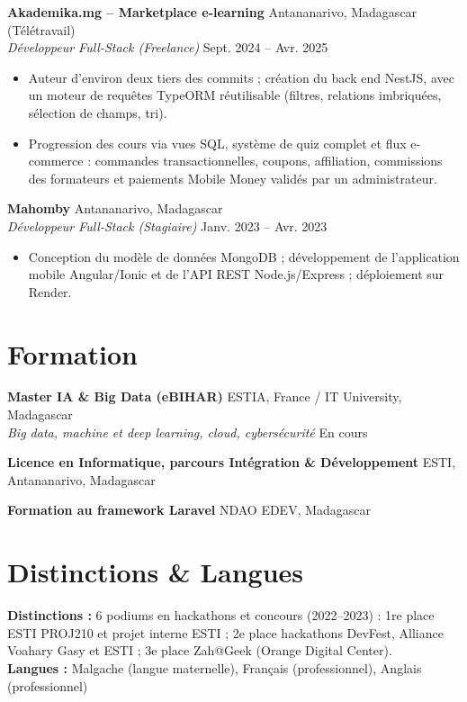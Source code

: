 \documentclass[10pt,a4paper]{article}
\newcommand{\role}[4]{%
  \vspace{3pt}%
  \textbf{#1} \hfill #2\\[-0.1em]
  \textit{#3} \hfill #4\par\vspace{1pt}}
\begin{document}
\role{Akademika.mg -- Marketplace e-learning}{Antananarivo, Madagascar (Télétravail)}{Développeur Full-Stack (Freelance)}{Sept. 2024 -- Avr. 2025}
\begin{itemize}
  \item Auteur d'environ deux tiers des commits ; création du back end NestJS, avec un moteur de requêtes TypeORM réutilisable (filtres, relations imbriquées, sélection de champs, tri).
  \item Progression des cours via vues SQL, système de quiz complet et flux e-commerce : commandes transactionnelles, coupons, affiliation, commissions des formateurs et paiements Mobile Money validés par un administrateur.
\end{itemize}

\role{Mahomby}{Antananarivo, Madagascar}{Développeur Full-Stack (Stagiaire)}{Janv. 2023 -- Avr. 2023}
\begin{itemize}
  \item Conception du modèle de données MongoDB ; développement de l'application mobile Angular/Ionic et de l'API REST Node.js/Express ; déploiement sur Render.
\end{itemize}

\section*{Formation}
\role{Master IA \& Big Data (eBIHAR)}{ESTIA, France / IT University, Madagascar}{Big data, machine et deep learning, cloud, cybersécurité}{En cours}
\vspace{3pt}\textbf{Licence en Informatique, parcours Intégration \& Développement} \hfill ESTI, Antananarivo, Madagascar\par
\vspace{1pt}\textbf{Formation au framework Laravel} \hfill NDAO EDEV, Madagascar\par

\section*{Distinctions \& Langues}
\textbf{Distinctions :} 6 podiums en hackathons et concours (2022--2023) : 1re place ESTI PROJ210 et projet interne ESTI ; 2e place hackathons DevFest, Alliance Voahary Gasy et ESTI ; 3e place Zah@Geek (Orange Digital Center).\\
\textbf{Langues :} Malgache (langue maternelle), Français (professionnel), Anglais (professionnel)
\end{document}
